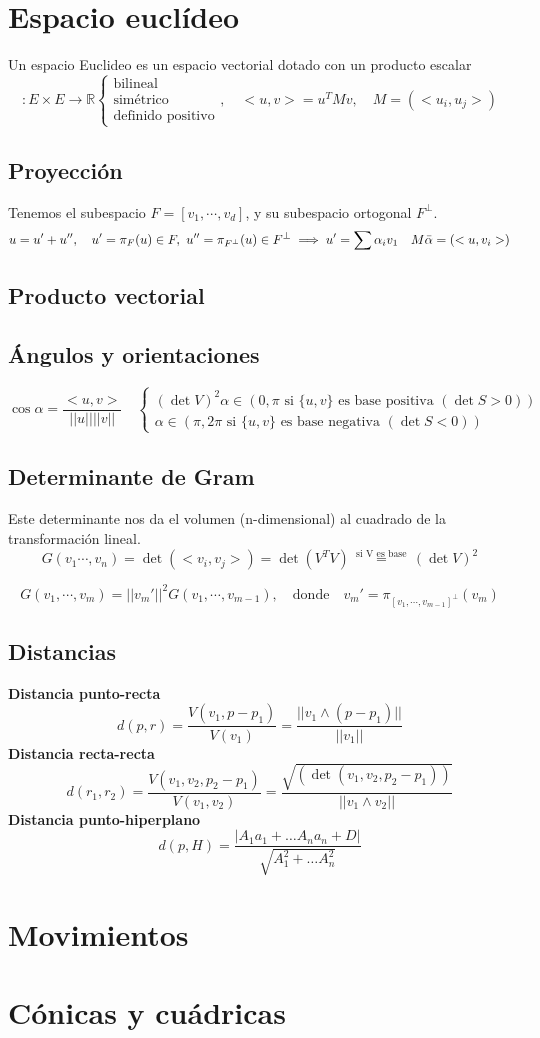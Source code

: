 \documentclass{article}
\newcommand{\R}{\mathbb{R}}
\newcommand{\h}{\hspace{1em}}
\newcommand{\w}[1]{\text{#1}}
\begin{document}
\section{Espacio euclídeo}
Un espacio Euclideo es un espacio vectorial dotado con un producto escalar 
\[<,>: E\times E \longrightarrow \R \begin{cases}
    \text{bilineal} \\
    \text{simétrico} \\
    \text{definido positivo}
\end{cases}
, \h
<u, v> = u^TMv,  \h M = (<u_i, u_j>)\]

\subsection{Proyección}
Tenemos el subespacio $F = [v_1, \cdots , v_d]$, y su subespacio ortogonal $F^\perp$.
\[u = u' +u'', \h u' = \pi_F(u)\in F,\ u''=\pi_{F^\perp}(u)\in F^\perp
\implies u' = \sum \alpha_iv_1 \h M\Bar{\alpha}=(<u, v_i>)\]

\subsection{Producto vectorial}

\subsection{Ángulos y orientaciones}
\[\cos \alpha = \frac{<u,v>}{||u||||v||} \h
\begin{cases} (\det V)^2
    \alpha \in (0, \pi \text{ si } \{u, v\} \text{ es base positiva } (\det S>0)) \\
    \alpha \in (\pi, 2\pi \text{ si } \{u, v\} \text{ es base negativa } (\det S<0))
\end{cases}
\]

\subsection{Determinante de Gram}
Este determinante nos da el volumen (n-dimensional) al cuadrado de la transformación lineal. 
\[G(v_1\cdots , v_n) = \det(<v_i, v_j>) = \det(V^TV) \,\stackrel{\text{si V es base}}{=}\, (\det V)^2\]

\[G(v_1, \cdots ,v_m) = ||v_m'||^2G(v_1, \cdots, v_{m-1}), \h \w{donde} \h v_m' = \pi_{[v_1, \cdots, v_{m-1}]^\perp}(v_m)\]

\subsection{Distancias}
\textbf{Distancia punto-recta}
\[d(p, r) = \frac{V(v_1, p-p_1)}{V(v_1)} = \frac{||v_1\wedge (p-p_1)|| }{||v_1||}\]
\noindent
\textbf{Distancia recta-recta}
\[d(r_1,r_2) = \frac{V(v_1, v_2, p_2-p_1)}{V(v_1, v_2)} = \frac{\sqrt{(\det(v_1, v_2, p_2-p_1))}}{||v_1\wedge v_2||} \] 
\noindent
\textbf{Distancia punto-hiperplano}
\[d(p, H) = \frac{|A_1a_1+\ldots A_na_n + D|}{\sqrt{A_1^2+ \ldots A_n^2}}\]

\section{Movimientos}

\section{Cónicas y cuádricas}
\end{document}
